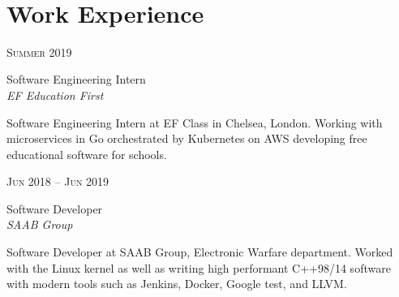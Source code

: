 \documentclass[10pt]{article} %
\begin{document}
\color{text1} %


\par{\\[1cm] %
	

\begin{minipage}[t]{0.5\textwidth} %
	

\section{Work Experience} 

{\raggedleft\textsc{Summer 2019}\par}

{\raggedright\large Software Engineering Intern\\ \textit{EF Education First}\\[5pt]}

    \normalsize{Software Engineering Intern at EF Class in Chelsea, London. Working with microservices in Go orchestrated by Kubernetes on AWS developing free educational software for schools.}\\

{\raggedleft\textsc{Jun 2018 -- Jun 2019}\par}

{\raggedright\large Software Developer\\ \textit{SAAB Group}\\[5pt]}

    \normalsize{Software Developer at SAAB Group, Electronic Warfare department. Worked with the Linux kernel as well as writing high performant C++98/14 software with modern tools such as Jenkins, Docker, Google test, and LLVM.}\\


\end{minipage}}
\end{document}

